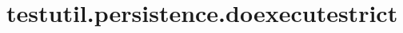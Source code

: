 \section{testutil.persistence.doexecutestrict}
\label{configuration:TestutilPersistenceDoexecutestrict}
\TODO
